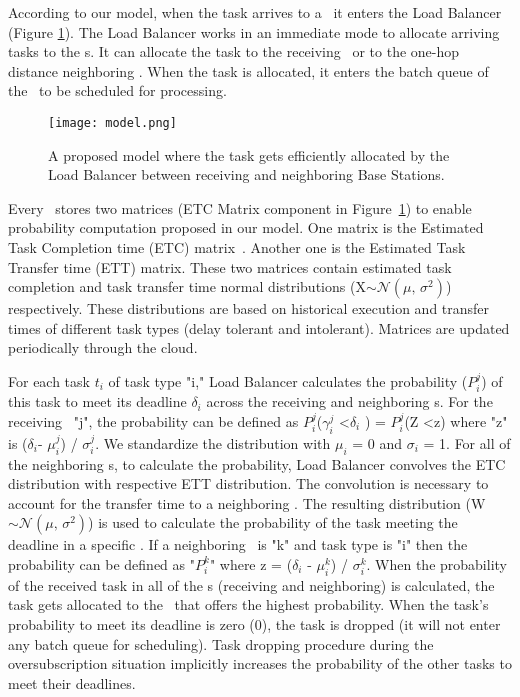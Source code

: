 \documentclass[11pt,a4paper]{article}
\begin{document}
According to our model, when the task arrives to a \bs \ it enters the Load Balancer (Figure \ref{fig:model}). The Load Balancer works in an immediate mode to allocate arriving tasks to the \bs s. It can allocate the task to the receiving \bs \ or to the one-hop distance neighboring \bs. When the task is allocated, it enters the batch queue of the \bs \ to be scheduled for processing.

\begin{figure}[h]
\centering
\texttt{[image: model.png]}
\caption{A proposed model where the task gets efficiently allocated by the Load Balancer between receiving and neighboring Base Stations.}
\label{fig:model}
\end{figure}

Every \bs \ stores two matrices (ETC Matrix component in Figure~\ref{fig:model}) to enable probability computation proposed in our model. One matrix is the Estimated Task Completion time (ETC) matrix~\cite{ali2000representing}. Another one is the Estimated Task Transfer time (ETT) matrix. These two matrices contain estimated task completion and task transfer time normal distributions (X$\sim \mathcal{N}(\mu,\,\sigma^{2})$) respectively. These distributions are based on historical execution and transfer times of different task types (delay tolerant and intolerant). Matrices are updated periodically through the cloud.

For each task $t_i$  of task type "i," Load Balancer calculates the probability ($P_i^j$) of this task to meet its deadline $\delta_i$ across the receiving and neighboring \bs s. For the receiving \bs \ "j", the probability can be defined as $P_i^j$($\gamma_i^j$ \textless $\delta_i$ ) = $P_i^j$(Z \textless z) where "z" is ($\delta_i$- $\mu_i^j$) / $\sigma_i^j$. We standardize the distribution with $\mu_i$ = 0 and $\sigma_i$ = 1. For all of the neighboring \bs s, to calculate the probability, Load Balancer convolves the ETC distribution with respective ETT distribution. The convolution is necessary to account for the transfer time to a neighboring \bs. 
The resulting distribution (W$\sim \mathcal{N}(\mu,\,\sigma^{2})$) is used to calculate the probability of the task meeting the deadline in a specific \bs. If a neighboring \bs \ is "k" and task type is "i" then the probability can be defined as "$P_i^k$" where z = ($\delta_i$ - $\mu_i^k$) / $\sigma_i^k$. When the probability of the received task in all of the \bs s (receiving and neighboring) is calculated, the task gets allocated to the \bs \ that offers the highest probability. When the task's probability to meet its deadline is zero (0), the task is dropped (it will not enter any batch queue for scheduling). Task dropping procedure during the oversubscription situation implicitly increases the probability of the other tasks to meet their deadlines.
\end{document}
